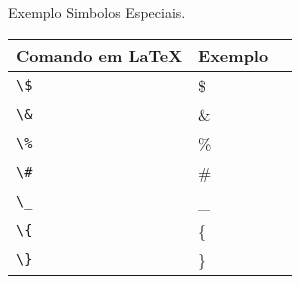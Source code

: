 \begin{quadro}[!htb]
    \centering
    \caption{Exemplo Simbolos Especiais.\label{qua:quadro-simbolos-especiais}}
        \begin{tabular}{|l|l|l|}
            \hline
                \multicolumn{1}{|c|}{\textbf{Comando em \LaTeX{}}} & \multicolumn{1}{c|}{\textbf{Exemplo}} \\ \hline
                \verb|\$|                                       & \$                                        \\ \hline
                \verb|\&|                                       & \&                                         \\ \hline
                \verb|\%|                                       & \%                                          \\ \hline
                \verb|\#|                                       & \#                                           \\ \hline
                \verb|\_|                                       & \_                                            \\ \hline
                \verb|\{|                                       & \{                                             \\ \hline
                \verb|\}|                                       & \}                                              \\ \hline
        \end{tabular}
\end{quadro}